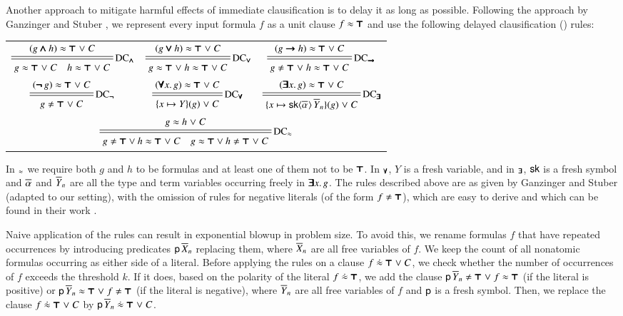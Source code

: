 Another approach to mitigate harmful effects of immediate clausification
is to delay it as long as possible. Following the approach by 
Ganzinger and Stuber \cite{gs-05-boolsup}, we represent every input formula $f$ as a unit clause $f \approx \pmb{\top}$ and use the following
delayed clausification () rules:

\vspace{2\jot}
\begin{tabular}{ccc}
  $\namedsimp{DC$_{\iand}$}
  { (g \iand h) \eq \itrue \llor C}
  { g \eq \itrue \llor C \quad h \eq \itrue \llor C }$ &
  $\namedsimp{DC$_{\ior}$}
  { (g \ior h) \eq \itrue \llor C}
  { g \eq \itrue \llor h \eq \itrue  \llor C }$ &
  $\namedsimp{DC$_{\iimplies}$}
  { (g\iimplies h) \eq \itrue \llor C}
  { g\not\eq \itrue \llor h \eq \itrue  \llor C } $ \\[2\jot]
  $\namedsimp{DC$_{\inot}$}
  { (\inot g) \eq \itrue \llor C}
  { g\not\eq \itrue \llor C}$ &
  $\namedsimp{DC$_{\iforall}$}
  { (\iforall x. \, g) \eq \itrue \llor C}
  { \{x \mapsto Y\}(g) \llor C }$ &
  $\namedsimp{DC$_{\iexists}$}
  { (\iexists x.\, g) \eq \itrue \llor C}
  { \{x \mapsto \cst{sk}\typeargs{\tuple{\alpha}{}} \, \tuplen{Y} \}(g) \llor C }$ 
  \\[2\jot]
  \multicolumn{3}{c}{$\namedsimp{DC$_\eq$}
  { g\eq h \llor C}
  { g\not\eq \itrue \lor h\eq\itrue \llor C \quad g \eq \itrue \lor h\not\eq\itrue \llor C}$}
\end{tabular}
\vspace{2\jot}

In $_\approx$ we require both $g$ and $h$ to be formulas and at least one of
them not to be $\pmb{\top}$. In $_{\pmb{\forall}}$, $Y$ is a fresh variable, and in
$_{\pmb{\exists}}$, $\mathsf{sk}$ is a fresh symbol and $\overline{\alpha}_{}$ and $\overline{Y}_{n}$ are all the type and term variables occurring
freely in $\pmb{\exists} x.\, g$. The rules described above are as given by Ganzinger and Stuber (adapted to
our setting), with the omission of rules for negative literals (of the form $ f \not\eq
\itrue$), which are easy to derive and which can be found in their work \cite{gs-05-boolsup}.

Naive application of the  rules can result in exponential blowup in
problem size. To avoid this, we rename formulas $f$ that have repeated
occurrences by introducing predicates $\mathsf{p} \, \overline{X}_{n}$ replacing them, where
$\overline{X}_{n}$ are all free variables of $f$. We keep the count of all nonatomic
formulas occurring as either side of a literal. Before applying the 
rules on a clause $f \mathrel{\dot{\approx}} \pmb{\top} \mathrel\lor C $, we check whether the
number of occurrences of $f$  exceeds the threshold $k$. If it does, based on the
polarity of the literal $f \mathrel{\dot{\approx}} \pmb{\top}$, we add the clause
$\cst{p} \, \tuplen{Y} \not\eq \itrue \llor f \eq \itrue$ (if the literal is
positive) or $\cst{p} \, \tuplen{Y} \eq \itrue \llor f \not\eq \itrue$ (if the
literal is negative), where $\overline{Y}_{n}$ are all free variables of $f$ and
$\mathsf{p}$ is a fresh symbol. Then, we replace the clause $f \mathrel{\dot{\approx}}
\pmb{\top} \mathrel\lor C$ by $ \mathsf{p} \, \overline{Y}_{n} \mathrel{\dot{\approx}} \pmb{\top} \mathrel\lor C$.


